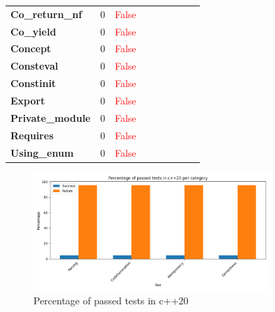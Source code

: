 \documentclass{article}
\begin{document}
\begin{xltabular}{\textwidth}{lcccccccc}
\textbf{{\fontsize{10}{12}\selectfont Co\_return\_nf}}& 0&\textcolor{red}{False} \\[0.5ex]
\textbf{{\fontsize{10}{12}\selectfont Co\_yield}}& 0&\textcolor{red}{False} \\[0.5ex]
\textbf{{\fontsize{10}{12}\selectfont Concept}}& 0&\textcolor{red}{False} \\[0.5ex]
\textbf{{\fontsize{10}{12}\selectfont Consteval}}& 0&\textcolor{red}{False} \\[0.5ex]
\textbf{{\fontsize{10}{12}\selectfont Constinit}}& 0&\textcolor{red}{False} \\[0.5ex]
\textbf{{\fontsize{10}{12}\selectfont Export}}& 0&\textcolor{red}{False} \\[0.5ex]
\textbf{{\fontsize{10}{12}\selectfont Private\_module}}& 0&\textcolor{red}{False} \\[0.5ex]
\textbf{{\fontsize{10}{12}\selectfont Requires}}& 0&\textcolor{red}{False} \\[0.5ex]
\textbf{{\fontsize{10}{12}\selectfont Using\_enum}}& 0&\textcolor{red}{False} \\[0.5ex]
\bottomrule
\end{xltabular}
\newpage
\begin{figure}[h!]
\centering
\includegraphics[width=0.8\textwidth]{../reports/clava/images/c++20_percentage.png}
\caption{Percentage of passed tests in c++20}
\label{fig:c++20_percentage}
\end{figure}
\newpage
\end{document}
